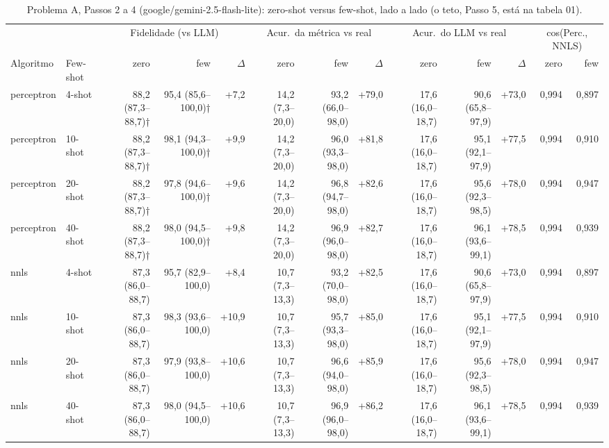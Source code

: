 \begin{table}[htbp]
\centering
\footnotesize
\caption{Problema A, Passos 2 a 4 (google/gemini-2.5-flash-lite): zero-shot versus few-shot, lado a lado (o teto, Passo 5, está na tabela 01).}
\label{tab:A_passo2_vs_passo3_flashlite}
\begin{tabular}{llrrrrrrrrrrr}
\toprule
 &  & \multicolumn{3}{c}{Fidelidade (vs LLM)} & \multicolumn{3}{c}{Acur.\ da métrica vs real} & \multicolumn{3}{c}{Acur.\ do LLM vs real} & \multicolumn{2}{c}{cos(Perc., NNLS)} \\ \cmidrule(lr){3-5} \cmidrule(lr){6-8} \cmidrule(lr){9-11} \cmidrule(lr){12-13}
Algoritmo & Few-shot & zero & few & $\Delta$ & zero & few & $\Delta$ & zero & few & $\Delta$ & zero & few \\
\midrule
perceptron & 4-shot & 88,2 (87,3–88,7)† & 95,4 (85,6–100,0)† & +7,2 & 14,2 (7,3–20,0) & 93,2 (66,0–98,0) & +79,0 & 17,6 (16,0–18,7) & 90,6 (65,8–97,9) & +73,0 & 0,994 & 0,897 \\
perceptron & 10-shot & 88,2 (87,3–88,7)† & 98,1 (94,3–100,0)† & +9,9 & 14,2 (7,3–20,0) & 96,0 (93,3–98,0) & +81,8 & 17,6 (16,0–18,7) & 95,1 (92,1–97,9) & +77,5 & 0,994 & 0,910 \\
perceptron & 20-shot & 88,2 (87,3–88,7)† & 97,8 (94,6–100,0)† & +9,6 & 14,2 (7,3–20,0) & 96,8 (94,7–98,0) & +82,6 & 17,6 (16,0–18,7) & 95,6 (92,3–98,5) & +78,0 & 0,994 & 0,947 \\
perceptron & 40-shot & 88,2 (87,3–88,7)† & 98,0 (94,5–100,0)† & +9,8 & 14,2 (7,3–20,0) & 96,9 (96,0–98,0) & +82,7 & 17,6 (16,0–18,7) & 96,1 (93,6–99,1) & +78,5 & 0,994 & 0,939 \\
\midrule
nnls & 4-shot & 87,3 (86,0–88,7) & 95,7 (82,9–100,0) & +8,4 & 10,7 (7,3–13,3) & 93,2 (70,0–98,0) & +82,5 & 17,6 (16,0–18,7) & 90,6 (65,8–97,9) & +73,0 & 0,994 & 0,897 \\
nnls & 10-shot & 87,3 (86,0–88,7) & 98,3 (93,6–100,0) & +10,9 & 10,7 (7,3–13,3) & 95,7 (93,3–98,0) & +85,0 & 17,6 (16,0–18,7) & 95,1 (92,1–97,9) & +77,5 & 0,994 & 0,910 \\
nnls & 20-shot & 87,3 (86,0–88,7) & 97,9 (93,8–100,0) & +10,6 & 10,7 (7,3–13,3) & 96,6 (94,0–98,0) & +85,9 & 17,6 (16,0–18,7) & 95,6 (92,3–98,5) & +78,0 & 0,994 & 0,947 \\
nnls & 40-shot & 87,3 (86,0–88,7) & 98,0 (94,5–100,0) & +10,6 & 10,7 (7,3–13,3) & 96,9 (96,0–98,0) & +86,2 & 17,6 (16,0–18,7) & 96,1 (93,6–99,1) & +78,5 & 0,994 & 0,939 \\
\bottomrule

\end{tabular}
\end{table}
